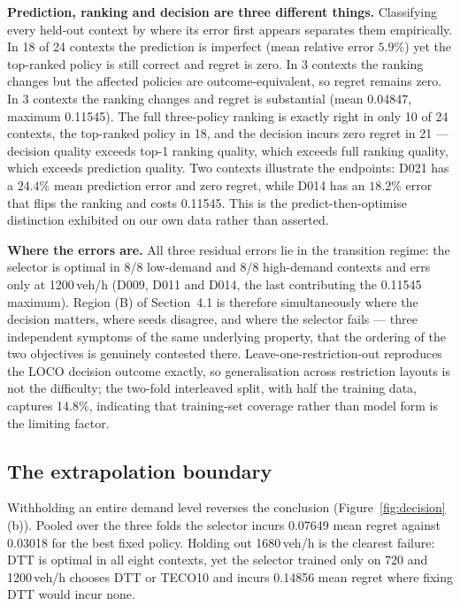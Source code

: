 \documentclass[10pt,a4paper]{article}
\begin{document}
\textbf{Prediction, ranking and decision are three different things.} Classifying every held-out context by where its error first appears separates them empirically. In 18 of 24 contexts the prediction is imperfect (mean relative error $5.9\%$) yet the top-ranked policy is still correct and regret is zero. In 3 contexts the ranking changes but the affected policies are outcome-equivalent, so regret remains zero. In 3 contexts the ranking changes and regret is substantial (mean 0.04847, maximum 0.11545). The full three-policy ranking is exactly right in only 10 of 24 contexts, the top-ranked policy in 18, and the decision incurs zero regret in 21 --- decision quality exceeds top-1 ranking quality, which exceeds full ranking quality, which exceeds prediction quality. Two contexts illustrate the endpoints: D021 has a $24.4\%$ mean prediction error and zero regret, while D014 has an $18.2\%$ error that flips the ranking and costs 0.11545. This is the predict-then-optimise distinction \cite{R11} exhibited on our own data rather than asserted.

\textbf{Where the errors are.} All three residual errors lie in the transition regime: the selector is optimal in 8/8 low-demand and 8/8 high-demand contexts and errs only at 1200\,veh/h (D009, D011 and D014, the last contributing the 0.11545 maximum). Region (B) of Section~4.1 is therefore simultaneously where the decision matters, where seeds disagree, and where the selector fails --- three independent symptoms of the same underlying property, that the ordering of the two objectives is genuinely contested there. Leave-one-restriction-out reproduces the LOCO decision outcome exactly, so generalisation across restriction layouts is not the difficulty; the two-fold interleaved split, with half the training data, captures 14.8\%, indicating that training-set coverage rather than model form is the limiting factor.

\subsection{The extrapolation boundary}
Withholding an entire demand level reverses the conclusion (Figure~\ref{fig:decision}(b)). Pooled over the three folds the selector incurs 0.07649 mean regret against 0.03018 for the best fixed policy. Holding out 1680\,veh/h is the clearest failure: DTT is optimal in all eight contexts, yet the selector trained only on 720 and 1200\,veh/h chooses DTT or TECO10 and incurs 0.14856 mean regret where fixing DTT would incur none.
\end{document}
